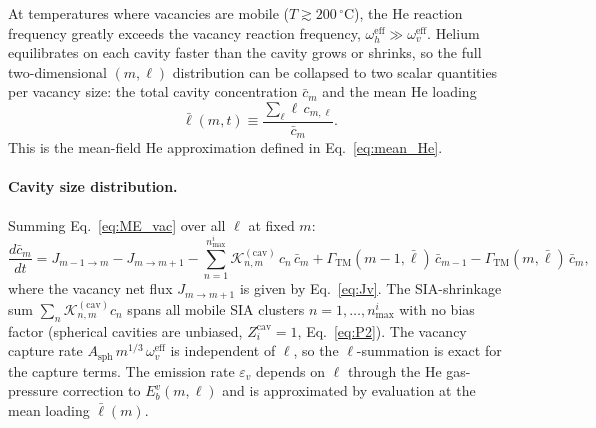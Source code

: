 At temperatures where vacancies are mobile ($T \gtrsim 200\,^\circ$C),
the He reaction frequency greatly exceeds the vacancy reaction
frequency, $\omega_h^{\mathrm{eff}} \gg \omega_v^{\mathrm{eff}}$.
Helium equilibrates on each cavity faster than the cavity grows or
shrinks, so the full two-dimensional $(m,\ell)$ distribution can be
collapsed to two scalar quantities per vacancy size: the total cavity
concentration $\bar{c}_m$ and the mean He loading
\begin{equation}\label{eq:lbar_def}
    \bar{\ell}(m,t)
    \equiv \frac{\sum_\ell \ell\,c_{m,\ell}}{\bar{c}_m}.
\end{equation}
This is the mean-field He approximation defined in
Eq.~\eqref{eq:mean_He}.

\paragraph{Cavity size distribution.}
Summing Eq.~\eqref{eq:ME_vac} over all $\ell$ at fixed $m$:
\begin{equation}\label{eq:case1_cm}
    \frac{d\bar{c}_m}{dt}
    = J_{m-1 \to m} - J_{m \to m+1}
    - \sum_{n=1}^{n_{\max}^i}
      \mathcal{K}_{n,m}^{(\mathrm{cav})}\,c_n\,\bar{c}_m
    + \Gamma_{\mathrm{TM}}(m{-}1,\bar{\ell})\,\bar{c}_{m-1}
    - \Gamma_{\mathrm{TM}}(m,\bar{\ell})\,\bar{c}_m,
\end{equation}
where the vacancy net flux $J_{m\to m+1}$ is given by
Eq.~\eqref{eq:Jv}. The SIA-shrinkage sum $\sum_n
\mathcal{K}_{n,m}^{(\mathrm{cav})} c_n$ spans all mobile SIA clusters
$n = 1,\ldots,n_{\max}^i$ with no bias factor (spherical cavities are
unbiased, $Z_i^{\mathrm{cav}} = 1$, Eq.~\ref{eq:P2}). The vacancy
capture rate $A_{\mathrm{sph}}\,m^{1/3}\,\omega_v^{\mathrm{eff}}$ is
independent of $\ell$, so the $\ell$-summation is exact for the capture
terms. The emission rate $\varepsilon_v$ depends on $\ell$ through the
He gas-pressure correction to $E_b^v(m,\ell)$ and is approximated by
evaluation at the mean loading $\bar{\ell}(m)$.

